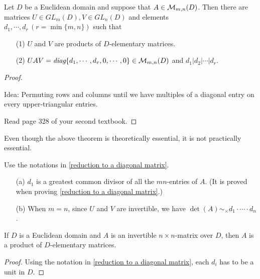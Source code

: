 \begin{thm}\label{reduction to a diagonal matrix}
    Let $D$ be a Euclidean domain and suppose that $A\in{\mathcal{M}}_{m, n}(D)$.
    Then there are matrices $U\in GL_m(D), V\in GL_n(D)$ and elements $d_1, \cdots, d_r\,(r=\min\{m, n\})$ such that
    \begin{enumerate}
        \item[(1)]
        {
            $U$ and $V$ are products of $D$-elementary matrices.
        }
        \item[(2)]
        {
            $UAV=\textit{diag}\{d_1, \cdots, d_r, 0, \cdots, 0\}\in{\mathcal{M}}_{m, n}(D)$ and $d_1|d_2|\cdots|d_r$.
        }
    \end{enumerate}
\end{thm}
\begin{proof}
    \begin{center}
        Idea: Permuting rows and columns until we have multiples of a diagonal entry on every upper-triangular entries.
    \end{center}
    \color{red}Read page 328 of your second textbook.\color{black}
\end{proof}
Even though the above theorem is theoretically essential, it is not practically essential.
\begin{prop}
    Use the notations in \cref{reduction to a diagonal matrix}.
    \begin{enumerate}
        \item[(a)]
        {
            $d_1$ is a greatest common divisor of all the $mn$-entries of $A$.
            (It is proved when proving \cref{reduction to a diagonal matrix}.)
        }
        \item[(b)]
        {
            When $m=n$, since $U$ and $V$ are invertible, we have $\det(A)\sim_\times d_1\cdot\cdots\cdot d_n$.
        }
    \end{enumerate}
\end{prop}
\begin{prop}
    If $D$ is a Euclidean domain and $A$ is an invertible $n\times n$-matrix over $D$, then $A$ is a product of $D$-elementary matrices.
\end{prop}
\begin{proof}
    Using the notation in \cref{reduction to a diagonal matrix}, each $d_i$ has to be a unit in $D$.
\end{proof}

